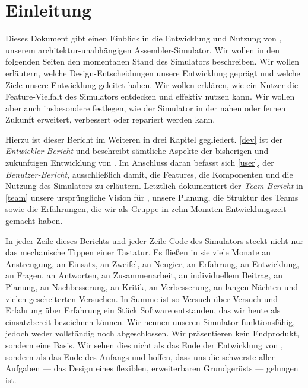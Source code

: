 
\chapter*{Einleitung}

Dieses Dokument gibt einen Einblick in die Entwicklung und Nutzung von
\erasim{}, unserem architektur-unabhängigen Assembler-Simulator. Wir wollen in
den folgenden Seiten den momentanen Stand des Simulators beschreiben. Wir wollen
erläutern, welche Design-Entscheidungen unsere Entwicklung geprägt und welche
Ziele unsere Entwicklung geleitet haben. Wir wollen erklären, wie ein Nutzer die
Feature-Vielfalt des Simulators entdecken und effektiv nutzen kann. Wir wollen
aber auch insbesondere festlegen, wie der Simulator in der nahen oder fernen
Zukunft erweitert, verbessert oder repariert werden kann.

Hierzu ist dieser Bericht im Weiteren in drei Kapitel gegliedert. \autoref{dev}
ist der \emph{Entwickler-Bericht} und beschreibt sämtliche Aspekte der
bisherigen und zukünftigen Entwicklung von \erasim{}. Im Anschluss daran befasst
sich \autoref{user}, der \emph{Benutzer-Bericht}, ausschließlich damit, die
Features, die Komponenten und die Nutzung des Simulators zu erläutern. Letztlich
dokumentiert der \emph{Team-Bericht} in \autoref{team} unsere ursprüngliche
Vision für \erasim{}, unsere Planung, die Struktur des Teams sowie die
Erfahrungen, die wir als Gruppe in zehn Monaten Entwicklungszeit gemacht haben.

In jeder Zeile dieses Berichts und jeder Zeile Code des Simulators steckt nicht
nur das mechanische Tippen einer Tastatur. Es fließen in sie viele Monate an
Anstrengung, an Einsatz, an Zweifel, an Neugier, an Erfahrung, an Entwicklung,
an Fragen, an Antworten, an Zusammenarbeit, an individuellem Beitrag, an
Planung, an Nachbesserung, an Kritik, an Verbesserung, an langen Nächten und
vielen gescheiterten Versuchen. In Summe ist so Versuch über Versuch und
Erfahrung über Erfahrung ein Stück Software entstanden, das wir heute als
einsatzbereit bezeichnen können. Wir nennen unseren Simulator funktionsfähig,
jedoch weder vollständig noch abgeschlossen. Wir präsentieren kein Endprodukt,
sondern eine Basis. Wir sehen dies nicht als das Ende der Entwicklung von
\erasim{}, sondern als das Ende des Anfangs und hoffen, dass uns die schwerste
aller Aufgaben --- das Design eines flexiblen, erweiterbaren Grundgerüsts ---
gelungen ist.

